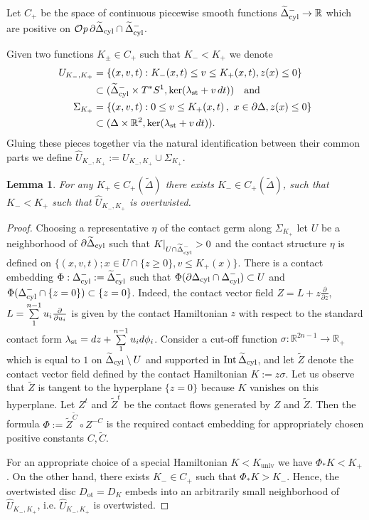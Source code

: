 \documentclass[12pt]{paper}
\theoremstyle{plain}
\newtheorem{lemma}[theorem]{Lemma}
\theoremstyle{definition}
\newcommand{\wt}{\widetilde}
\newcommand{\wh}{\widehat}
\newcommand{\p}{\partial}
\newcommand{\R}{{\mathbb{R}}}
\newcommand{\st}{{\rm st}}
\newcommand{\cyl}{{\rm cyl}}
\newcommand{\Int}{{\rm Int\,}} %
\newcommand{\univ}{\mathrm{univ}}
\newcommand{\ot}{\mathrm{ot}}
\def\Op{{\mathcal O}{\it p}\,}
\numberwithin{figure}{section}
\begin{document}
Let $C_+ $ be the space of continuous piecewise smooth functions
$\wt\Delta_\cyl^-\to \R$ which are positive on $\Op \p\wt\Delta_\cyl\cap\wt\Delta_\cyl^-$.

Given  two functions $K_\pm\in C_+ $ such that $K_-<K_+$
we denote
\begin{align*}
	U_{K_-,K_+} &= \{(x,v,t): K_-(x,t)\leq  v \leq  K_+(x,t), z(x)\leq 0\} \\&\subset (\wt\Delta_\cyl ^-\times T^*S^1, \ker(\lambda_{\st} + v\,dt)) \quad
	\mbox{and} \\
	\Sigma_{K_+} &= \{(x,v,t): 0 \leq v \leq K_+(x, t)\,,\,\, x \in \p \Delta, z(x)\leq 0\} \\&
	\subset (\Delta \times \R^2, \ker(\lambda_{\st} + v\,dt)).
\end{align*}
Gluing these pieces together via  the natural identification between their common parts  
we define  $\wh U_{K_-,K_+} :=U_{K_-,K_+}  \cup  \Sigma_{K_+}$.


\begin{lemma}\label{lm:base-change}
For any $K_+\in C_+(\wt\Delta)$ there exists  $K_-\in C_+(\wt\Delta)$, such that $K_-<K_+$ such that  $\wh U_{K_-,K_+}$ is overtwisted.
\end{lemma}
\begin{proof}
 
Choosing a representative $\eta$ of the contact germ along $\Sigma_{K_+}$ let $U$ be a neighborhood of $\p \wt\Delta_\cyl $ such that $K|_{U\cap\wt\Delta_\cyl^-}>0$ and the contact structure $\eta$ is defined on $\{(x,v,t); x\in U\cap\{z\geq 0\}, v\leq K_+(x)\}$.
There is a contact embedding
$\Phi:  \Delta_\cyl^-:= \wt\Delta_\cyl^-$ such that
$\Phi(\p\Delta_\cyl\cap \Delta_\cyl^-)\subset U$ and $\Phi(\Delta_\cyl^-\cap\{z=0\})\subset
\{z=0\}$.
Indeed,   the contact vector field $Z=L+z\frac{\p}{\p z}$, $L=\sum\limits_1^{n-1}\limits u_i\frac{\p}{\p u_i}$ is given by the contact Hamiltonian $z$
with respect to the standard contact form $\lambda_\st=dz+\sum\limits_1^{n-1}u_id\phi_i$.
Consider a cut-off function  $\sigma:\R^{2n-1}\to\R_+$ which is equal to $1$
on $\wt\Delta_\cyl\setminus U$ and supported in $\Int\wt\Delta_\cyl$, and let $\wt Z$ denote the contact vector field defined by the contact Hamiltonian $K:=z\sigma$.
Let us observe that $\wt Z$ is tangent to the hyperplane  $\{z=0\}$ because $K$ vanishes on this hyperplane. Let $Z^t$ and $\wt Z^t$ be the contact flows generated by $Z$ and $\wt Z$.
Then  the formula
$\Phi:= \wt Z^{\wt C}\circ Z^{-C}$ is the required  contact embedding
for appropriately chosen positive constants $C,\wt C$.

 
For   an appropriate choice of a  special Hamiltonian $K<K_\univ$ we have $\Phi_*K< K_+$.
On the other hand, there exists $K_-\in C_+$ such that $\Phi_*K>K_-$.
Hence, the overtwisted disc $D_\ot=D_K$ embeds into an arbitrarily small neighborhood of  $\wh U_{K_-,K_+}$, i.e.  $\wh U_{K_-,K_+}$ is overtwisted.
\end{proof}
\end{document}
